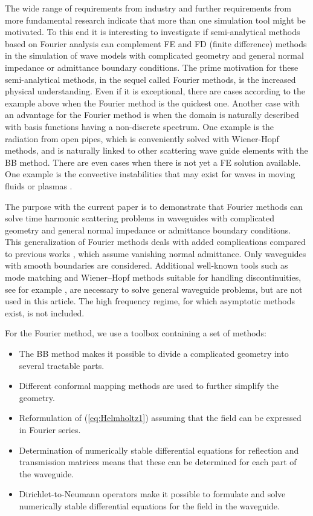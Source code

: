 \documentclass{svjour3}
\begin{document}
The wide range of requirements from industry and further requirements
from more fundamental research indicate that more than one simulation
tool might be motivated. To this end it is interesting to investigate
if semi-analytical methods based on Fourier analysis can complement FE
and FD (finite difference) methods in the simulation of wave models
with complicated geometry and general normal impedance or admittance
boundary conditions. The prime motivation for these semi-analytical
methods, in the sequel called Fourier methods, is the increased
physical understanding. Even if it is exceptional, there are cases
according to the example above when the Fourier method is the
quickest one. Another case with an advantage for the Fourier
method is when the domain is naturally described with basis functions
having a non-discrete spectrum. One example is the radiation from
open pipes, which is conveniently solved with Wiener-Hopf methods, and
is naturally linked to other scattering wave guide elements with the
BB method. There are even cases when there is not yet a FE solution
available. One example is the convective instabilities that may exist
for waves in moving fluids \cite{nilssonbrander1980a} or plasmas
\cite{briggs1964}.

The purpose with the current paper is to demonstrate that Fourier
methods can solve time harmonic scattering problems in waveguides with
complicated geometry and general normal impedance or admittance
boundary conditions. This generalization of Fourier methods deals with
added complications compared to previous works
\cite{maurel+mercier+felix:2014,Nilsson:2002}, which assume vanishing
normal admittance. Only waveguides with smooth boundaries are
considered. Additional well-known tools such as mode matching and
Wiener--Hopf methods suitable for handling discontinuities, see for
example \cite{jones1986}, are necessary to solve general waveguide
problems, but are not used in this article. The high frequency regime,
for which asymptotic methods exist, is not included.

For the Fourier method, we use a toolbox containing a set of
methods:
\begin{itemize}
\item The BB method makes it possible to divide a complicated geometry
  into several tractable parts.
\item Different conformal mapping methods are used to further simplify
  the geometry.
\item Reformulation of (\ref{eq:Helmholtz1}) assuming that the field
  can be expressed in Fourier series.
\item Determination of numerically stable differential equations for
  reflection and transmission matrices means that these can be
  determined for each part of the waveguide.
\item Dirichlet-to-Neumann operators make it possible to formulate and
  solve numerically stable differential equations for the field in the
  waveguide.
\end{itemize}
\end{document}
